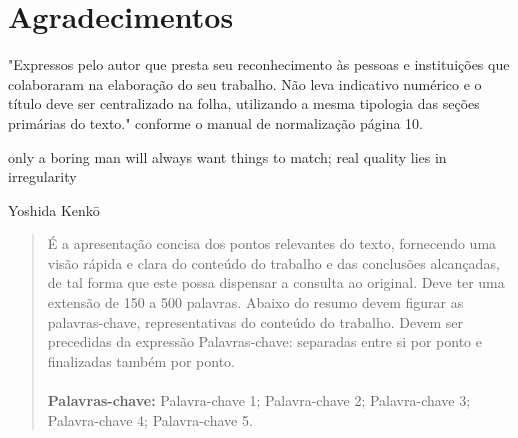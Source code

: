 
\maketitle
\makecover %


% 
% 
%
\makeapproval %

\dedication{Folha na qual o autor presta uma homenagem ou dedica seu trabalho. Não leva título e a dedicatória deve aparecer na parte inferior da página, a 8cm da margem esquerda.}

\clearpage\pagestyle{empty}
\chapter*{Agradecimentos}
"Expressos pelo autor que presta seu reconhecimento às pessoas e instituições que
colaboraram na elaboração do seu trabalho. Não leva indicativo numérico e o título
deve ser centralizado na folha, utilizando a mesma tipologia das seções primárias do
texto." conforme o manual de normalização página 10.
\clearpage


\epigraph{only a boring man will always want things to match;
real quality lies in irregularity}{Yoshida Kenkō}

\clearpage\pagestyle{empty}

\begin{abstract}
    É a apresentação concisa dos pontos relevantes do texto, fornecendo uma visão rápida
    e clara do conteúdo do trabalho e das conclusões alcançadas, de tal forma que este
    possa dispensar a consulta ao original. Deve ter uma extensão de 150 a 500 palavras.
    Abaixo do resumo devem figurar as palavras-chave, representativas do conteúdo do
    trabalho. Devem ser precedidas da expressão Palavras-chave: separadas entre si por
    ponto e finalizadas também por ponto.
    \\ \\
    \textbf{Palavras-chave:} Palavra-chave 1; Palavra-chave 2; Palavra-chave 3; Palavra-chave 4; Palavra-chave 5.
\end{abstract}
\clearpage

